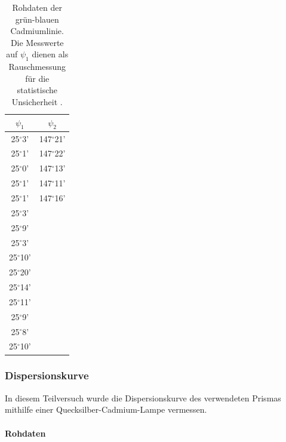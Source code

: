 \documentclass[12pt,a4paper]{article}
\begin{document}
	\begin{table}
		\begin{center}
			\begin{tabular}{|c|c|}
				\hline 
				$\psi_1$ & $\psi_2$ \\ 
				\hline 
				25$^{\circ}$3' & 147$^{\circ}$21' \\ 
				\hline 
				25$^{\circ}$1' & 147$^{\circ}$22' \\ 
				\hline 
				25$^{\circ}$0'& 147$^{\circ}$13' \\ 
				\hline 
				25$^{\circ}$1' & 147$^{\circ}$11' \\ 
				\hline 
				25$^{\circ}$1' & 147$^{\circ}$16' \\ 
				\hline 
				25$^{\circ}$3' & \\ 
				\hline 
				25$^{\circ}$9' & \\ 
				\hline 
				25$^{\circ}$3' & \\ 
				\hline 
				25$^{\circ}$10' & \\ 
				\hline 
				25$^{\circ}$20' & \\ 
				\hline 
				25$^{\circ}$14' & \\ 
				\hline 
				25$^{\circ}$11' & \\ 
				\hline 
				25$^{\circ}$9' & \\ 
				\hline 
				25$^{\circ}$8' & \\ 
				\hline 
				25$^{\circ}$10' & \\ 
				\hline 
				
			\end{tabular} 
			
			\caption{Rohdaten der grün-blauen Cadmiumlinie. Die Messwerte auf $\psi_1$ dienen als Rauschmessung für die statistische Unsicherheit .}
			\label{tab:RauschenPrisma}
		\end{center}
	\end{table}
	
	
	\subsubsection{Dispersionskurve}
	In diesem Teilversuch wurde die Dispersionskurve des verwendeten Prismas mithilfe einer Quecksilber-Cadmium-Lampe vermessen.
	
	
	\paragraph{Rohdaten}
	
\end{document}
